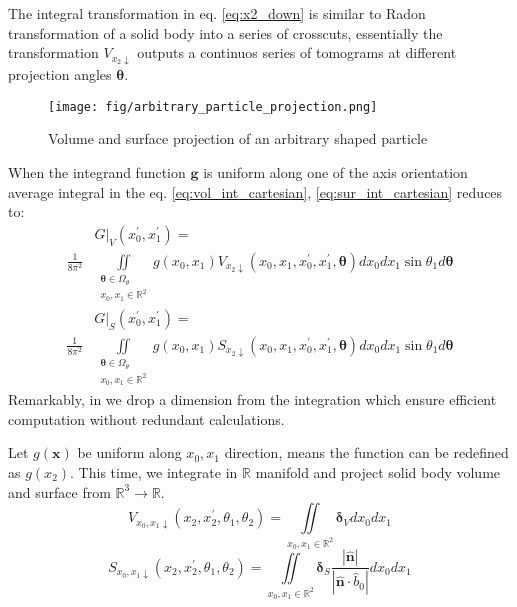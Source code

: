 \documentclass[10pt, a4paper]{article}
\begin{document}
\begin{multicols}{2}
The integral transformation in eq. \ref{eq:x2_down} is similar to Radon transformation of a solid body into a series of crosscuts, 
essentially the transformation $V_{x_2 \downarrow}$ outputs a continuos series of tomograms at different projection angles $\bm{\theta}$.

\begin{figure}[H]
    \centering
    \texttt{[image: fig/arbitrary\_particle\_projection.png]}
    \caption{
        Volume and surface projection of an arbitrary shaped particle
    }
    \label{fig:arbitrary_particle_projection}
\end{figure}

When the integrand function $\bm{g}$ is uniform along one of the axis orientation average integral in the eq. \ref{eq:vol_int_cartesian}, \ref{eq:sur_int_cartesian} reduces to:
\begin{equation} 
    \begin{aligned}
        &\left.G\right|_V (x_0^{\prime}, x_1^{\prime}) = \\
        \frac{1}{8\pi^2} &\iint \limits_{
            \substack{  \bm{\theta} \in \Omega_{\theta} \\
                        x_0, x_1 \in \mathbb{R}^2
                        }}
        g(x_0, x_1) V_{x_2 \downarrow}(x_0, x_1, x^{\prime}_0, x^{\prime}_1, \bm{\theta}) dx_0 dx_1 \sin\theta_1 d\bm{\theta}
    \end{aligned}
\end{equation}
\begin{equation}
    \begin{aligned}
        &\left.G\right|_S (x_0^{\prime}, x_1^{\prime}) = \\
        \frac{1}{8\pi^2} &\iint \limits_{
            \substack{  \bm{\theta} \in \Omega_{\theta} \\
                        x_0, x_1 \in \mathbb{R}^2
                        }}
        g(x_0, x_1) S_{x_2 \downarrow}(x_0, x_1, x^{\prime}_0, x^{\prime}_1, \bm{\theta}) dx_0 dx_1 \sin\theta_1 d\bm{\theta}
    \end{aligned}
\end{equation}
Remarkably, in we drop a dimension from the integration which ensure efficient computation without redundant calculations.

Let $g(\bm{x})$ be uniform along $x_0, x_1$ direction, means the function can be redefined as $g(x_2)$.
This time, we integrate in $\mathbb{R}$ manifold and project solid body volume and surface from $\mathbb{R}^3 \to \mathbb{R}$.
\begin{equation}\label{eq:x0x1_down}
        V_{x_0, x_1 \downarrow}(x_2, x^{\prime}_2, \theta_1, \theta_2) = 
        \iint \limits_{x_0, x_1 \in \mathbb{R}^2}
        \bm{\delta}_V dx_0 dx_1
\end{equation}
\begin{equation}
    S_{x_0, x_1 \downarrow}(x_2, x^{\prime}_2, \theta_1, \theta_2) = 
    \iint \limits_{x_0, x_1 \in \mathbb{R}^2}
    \bm{\delta}_S \frac{|\hat{\bm{n}}|}{|\hat{\bm{n}} \cdot \hat{b}_0|} dx_0 dx_1
\end{equation}


\end{multicols}
\end{document}
